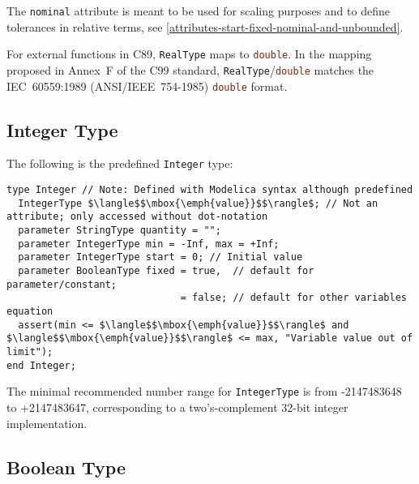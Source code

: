 The \lstinline!nominal! attribute is meant to be used for scaling purposes and to
define tolerances in relative terms, see \cref{attributes-start-fixed-nominal-and-unbounded}.

\begin{nonnormative}
For external functions in C89, \lstinline!RealType! maps to \lstinline[language=C]!double!.  In the mapping proposed in Annex~F of the C99 standard,
\lstinline!RealType!/\lstinline[language=C]!double! matches the IEC~60559:1989 (ANSI/IEEE~754-1985) \lstinline[language=C]!double! format.
\end{nonnormative}

\subsection{Integer Type}\label{integer-type}

The following is the predefined \lstinline!Integer! type:
\begin{lstlisting}[language=modelica]
type Integer // Note: Defined with Modelica syntax although predefined
  IntegerType $\langle$$\mbox{\emph{value}}$$\rangle$; // Not an attribute; only accessed without dot-notation
  parameter StringType quantity = "";
  parameter IntegerType min = -Inf, max = +Inf;
  parameter IntegerType start = 0; // Initial value
  parameter BooleanType fixed = true,  // default for parameter/constant;
                              = false; // default for other variables
equation
  assert(min <= $\langle$$\mbox{\emph{value}}$$\rangle$ and $\langle$$\mbox{\emph{value}}$$\rangle$ <= max, "Variable value out of limit");
end Integer;
\end{lstlisting}%
%
%
%
%

The minimal recommended number range for \lstinline!IntegerType! is from -2147483648 to +2147483647, corresponding to a two's-complement 32-bit integer implementation.

\subsection{Boolean Type}\label{boolean-type}

